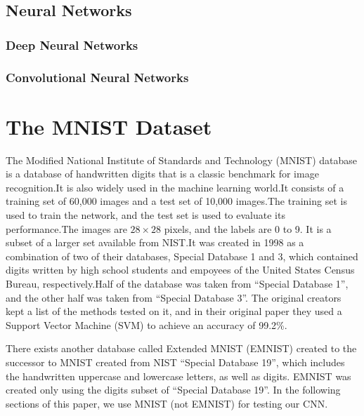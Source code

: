 \documentclass[conference]{IEEEtran}
\begin{document}
\subsection{Neural Networks}
\blindtext
\subsubsection{Deep Neural Networks}
\blindtext
\subsubsection{Convolutional Neural Networks}
\cite{Goodfellow-et-al-2016}
\blindtext

\section{The MNIST Dataset}
The Modified National Institute of Standards and Technology (MNIST) database is a database of handwritten digits \cite{6296535} that is a classic benchmark for image recognition.\@ It is also widely used in the machine learning world\cite{Platt1998}.\@ It consists of a training set of 60,000 images and a test set of 10,000 images.\@ The training set is used to train the network, and the test set is used to evaluate its performance.\@ The images are $28 \times 28$ pixels, and the labels are 0 to 9. It is a subset of a larger set available from NIST.\@ It was created in 1998 as a combination of two of their databases, Special Database 1 and 3, which contained digits written by high school students and empoyees of the United States Census Bureau, respectively.\@ Half of the database was taken from ``Special Database 1'', and the other half was taken from ``Special Database 3''. The original creators kept a list of the methods tested on it\cite{726791, mnist}, and in their original paper they used a Support Vector Machine (SVM) to achieve an accuracy of 99.2\%\cite{1265868}.
\par
There exists another database called Extended MNIST (EMNIST) created to the successor to MNIST\cite{emnist} created from NIST ``Special Database 19'', which includes the handwritten uppercase and lowercase letters, as well as digits.\cite{emnist2} EMNIST was created only using the digits subset of ``Special Database 19''. In the following sections of this paper, we use MNIST (not EMNIST) for testing our CNN.\@
\end{document}
